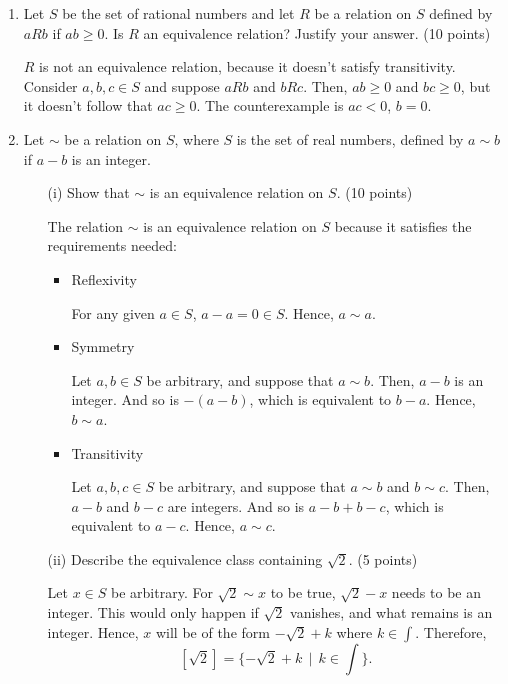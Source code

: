 \begin{enumerate}
    \item Let \(S\) be the set of rational numbers and let \(R\) be a relation on \(S\) defined by \(aRb\) if \(ab \geq 0\). Is \(R\) an equivalence relation? Justify your answer. (10 points)

    \(R\) is not an equivalence relation, because it doesn't satisfy transitivity. Consider \(a,b,c\in S\) and suppose \(aRb\) and \(bRc\). Then, \(ab \geq 0\) and \(bc \geq 0\), but it doesn't follow that \(ac \geq 0\). The counterexample is \(ac < 0\), \(b = 0\).

    \item Let \(\sim\) be a relation on \(S\), where \(S\) is the set of real numbers, defined by \(a \sim b\) if \(a - b\) is an integer.
    \begin{enumerate}
        \item[(i)] Show that \(\sim\) is an equivalence relation on \(S\). (10 points)

        The relation \(\sim\) is an equivalence relation on \(S\) because it satisfies the requirements needed:
        \begin{itemize}
            \item Reflexivity

            For any given \(a\in S\), \(a - a = 0\in S\). Hence, \(a \sim a\).

            \item Symmetry

            Let \(a,b\in S\) be arbitrary, and suppose that \(a \sim b\). Then, \(a - b\) is an integer. And so is \(-(a - b)\), which is equivalent to \(b - a\). Hence, \(b \sim a\).

            \item Transitivity

            Let \(a,b,c\in S\) be arbitrary, and suppose that \(a \sim b\) and \(b \sim c\). Then, \(a - b\) and \(b - c\) are integers. And so is \(a - b + b - c\), which is equivalent to \(a - c\). Hence, \(a \sim c\).
        \end{itemize}

        \item[(ii)] Describe the equivalence class containing \(\sqrt{2}\). (5 points)

        Let \(x\in S\) be arbitrary. For \(\sqrt{2} \sim x\) to be true, \(\sqrt{2} - x\) needs to be an integer. This would only happen if \(\sqrt{2}\) vanishes, and what remains is an integer. Hence, \(x\) will be of the form \(-\sqrt{2} + k\) where \(k\in \int\). Therefore, \[
            [\sqrt{2}] = \{-\sqrt{2} + k \,\mid\, k\in\int\}.
        \]


\end{enumerate}
\end{enumerate}
